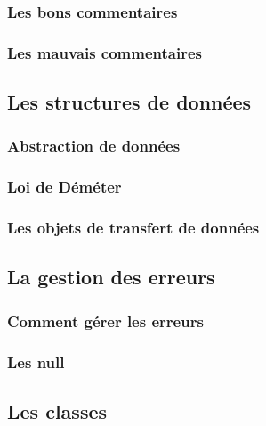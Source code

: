 \begin{frame}
    \frametitle{Les bons commentaires}
\end{frame}

\begin{frame}
    \frametitle{Les mauvais commentaires}
\end{frame}

\subsection{Les structures de données}
\label{subsec:pratiques-types}

\begin{frame}
    \frametitle{Abstraction de données}
\end{frame}

\begin{frame}
    \frametitle{Loi de Déméter}
\end{frame}

\begin{frame}
    \frametitle{Les objets de transfert de données}
\end{frame}

\subsection{La gestion des erreurs}
\label{subsec:pratiques-erreurs}

\begin{frame}
    \frametitle{Comment gérer les erreurs}
\end{frame}

\begin{frame}
    \frametitle{Les null}
\end{frame}

\subsection{Les classes}
\label{subsec:pratiques-classes}

